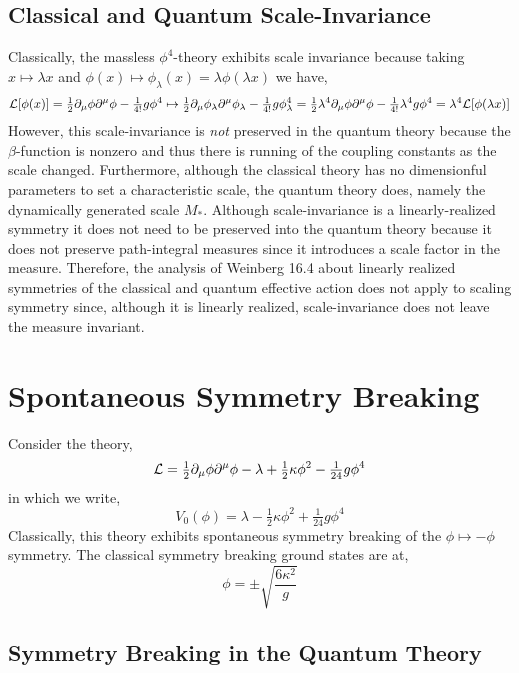 \documentclass[12pt]{article}
\begin{document}
\subsection{Classical and Quantum Scale-Invariance}

Classically, the massless $\phi^4$-theory exhibits scale invariance because taking $x \mapsto \lambda x$ and $\phi(x) \mapsto \phi_{\lambda}(x) = \lambda \phi(\lambda x)$ we have,
\[ \mathcal{L}[\phi(x)] = \tfrac{1}{2} \partial_\mu \phi \partial^\mu \phi - \tfrac{1}{4!} g \phi^4 \mapsto \tfrac{1}{2} \partial_\mu \phi_{\lambda} \partial^\mu \phi_{\lambda} - \tfrac{1}{4!} g \phi_{\lambda}^4 = \tfrac{1}{2} \lambda^{4} \partial_\mu \phi \partial^\mu \phi - \tfrac{1}{4!} \lambda^{4} g \phi^4 = \lambda^4 \mathcal{L}[\phi(\lambda x)] \]
However, this scale-invariance is \textit{not} preserved in the quantum theory because the $\beta$-function is nonzero and thus there is running of the coupling constants as the scale changed. Furthermore, although the classical theory has no dimensionful parameters to set a characteristic scale, the quantum theory does, namely the dynamically generated scale $M_{*}$. Although scale-invariance is a linearly-realized symmetry it does not need to be preserved into the quantum theory because it does not preserve path-integral measures since it introduces a scale factor in the measure. Therefore, the analysis of Weinberg 16.4 about linearly realized symmetries of the classical and quantum effective action does not apply to scaling symmetry since, although it is linearly realized, scale-invariance does not leave the measure invariant.  

\section{Spontaneous Symmetry Breaking}

Consider the theory,
\[ \mathcal{L} = \tfrac{1}{2} \partial_\mu \phi \partial^\mu \phi - \lambda + \tfrac{1}{2} \kappa \phi^2 - \tfrac{1}{24} g \phi^4 \]
in which we write,
\[ V_0(\phi) = \lambda - \tfrac{1}{2} \kappa \phi^2 + \tfrac{1}{24} g \phi^4 \]
Classically, this theory exhibits spontaneous symmetry breaking of the $\phi \mapsto - \phi$ symmetry. The classical symmetry breaking ground states are at,
\[ \phi = \pm \sqrt{\frac{6\kappa^2}{g}} \]

\subsection{Symmetry Breaking in the Quantum Theory}
\end{document}
